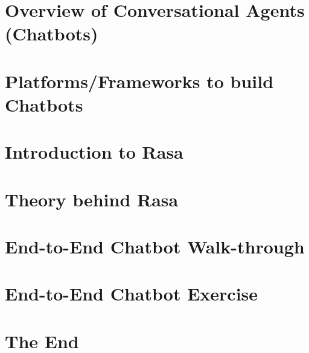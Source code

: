 \section[Overview]{Overview of Conversational Agents (Chatbots)}


\section[Platforms]{Platforms/Frameworks to build Chatbots}



\section[Intro]{Introduction to Rasa}



\section[Theory]{Theory behind Rasa}



\section[Zomato]{End-to-End Chatbot Walk-through}

\section[IPL]{End-to-End Chatbot Exercise}

% 
% 

% 
% 



\section[End]{The End}

